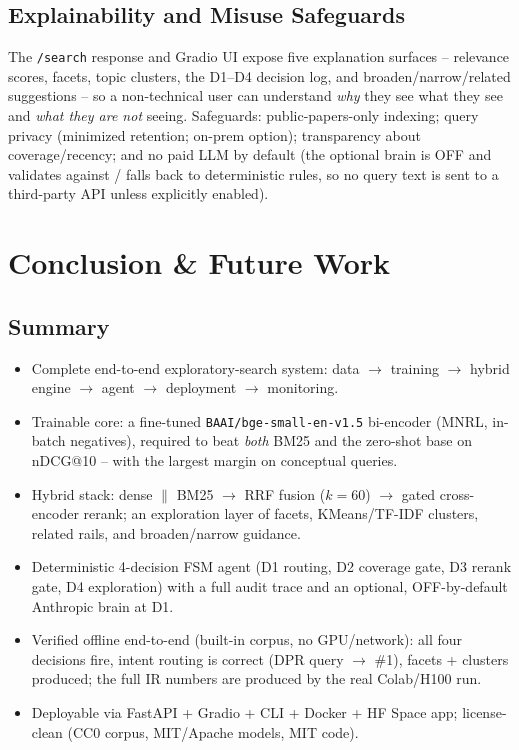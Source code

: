 \documentclass[12pt,a4paper]{article}
\begin{document}
\subsection{Explainability and Misuse Safeguards}
The \texttt{/search} response and Gradio UI expose five explanation surfaces -- relevance scores, facets, topic clusters, the D1--D4 decision log, and broaden/narrow/related suggestions -- so a non-technical user can understand \emph{why} they see what they see and \emph{what they are not} seeing. Safeguards: public-papers-only indexing; query privacy (minimized retention; on-prem option); transparency about coverage/recency; and no paid LLM by default (the optional brain is OFF and validates against / falls back to deterministic rules, so no query text is sent to a third-party API unless explicitly enabled).

\section{Conclusion \& Future Work}

\subsection{Summary}
\begin{itemize}\setlength\itemsep{0.15em}
  \item Complete end-to-end exploratory-search system: data $\rightarrow$ training $\rightarrow$ hybrid engine $\rightarrow$ agent $\rightarrow$ deployment $\rightarrow$ monitoring.
  \item Trainable core: a fine-tuned \texttt{BAAI/bge-small-en-v1.5} bi-encoder (MNRL, in-batch negatives), required to beat \emph{both} BM25 and the zero-shot base on nDCG@10 -- with the largest margin on conceptual queries.
  \item Hybrid stack: dense $\parallel$ BM25 $\rightarrow$ RRF fusion ($k=60$) $\rightarrow$ gated cross-encoder rerank; an exploration layer of facets, KMeans/TF-IDF clusters, related rails, and broaden/narrow guidance.
  \item Deterministic 4-decision FSM agent (D1 routing, D2 coverage gate, D3 rerank gate, D4 exploration) with a full audit trace and an optional, OFF-by-default Anthropic brain at D1.
  \item Verified offline end-to-end (built-in corpus, no GPU/network): all four decisions fire, intent routing is correct (DPR query $\rightarrow$ \#1), facets + clusters produced; the full IR numbers are produced by the real Colab/H100 run.
  \item Deployable via FastAPI + Gradio + CLI + Docker + HF Space app; license-clean (CC0 corpus, MIT/Apache models, MIT code).
\end{itemize}
\end{document}
